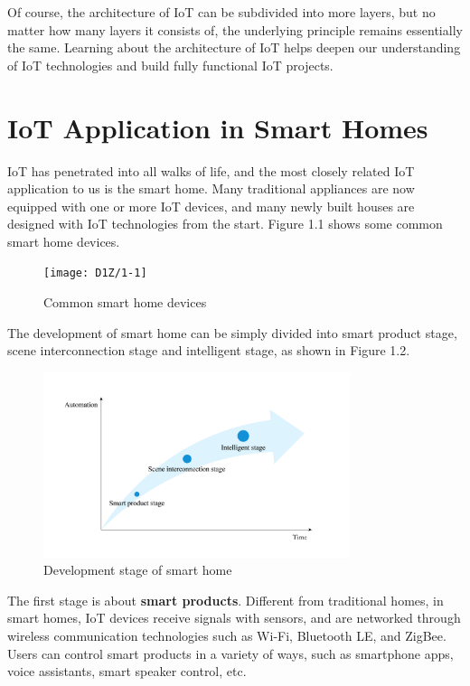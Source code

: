 \documentclass[a4paper,12pt,openany]{book}
\begin{document}
Of course, the architecture of IoT can be subdivided into more layers, but no matter how many layers it consists of, the underlying principle remains essentially the same. Learning about the architecture of IoT helps deepen our understanding of IoT technologies and build fully functional IoT projects.

\section{IoT Application in Smart Homes}
IoT has penetrated into all walks of life, and the most closely related IoT application to us is the smart home. Many traditional appliances are now equipped with one or more IoT devices, and many newly built houses are designed with IoT technologies from the start. Figure 1.1 shows some common smart home devices.

\begin{figure}[!ht]
    \centering
    \texttt{[image: D1Z/1-1]}
    \caption{Common smart home devices}
\end{figure}

The development of smart home can be simply divided into smart product stage, scene interconnection stage and intelligent stage, as shown in Figure 1.2.

\begin{figure}[!ht]
    \centering
    \includegraphics[width=0.8\textwidth]{D1Z/1-2}
    \caption{Development stage of smart home}
\end{figure}

The first stage is about \textbf{smart products}. Different from traditional homes, in smart homes, IoT devices receive signals with sensors, and are networked through wireless communication technologies such as Wi-Fi, Bluetooth LE, and ZigBee. Users can control smart products in a variety of ways, such as smartphone apps, voice assistants, smart speaker control, etc.
\end{document}
